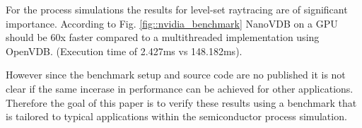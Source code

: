 For the process simulations the results for level-set raytracing are of significant importance. 
According to Fig. \ref{fig::nvidia_benchmark} NanoVDB on a GPU should be 60x faster compared to a multithreaded implementation using OpenVDB. (Execution time of 2.427ms vs 148.182ms).

However since the benchmark setup and source code are no published it is not clear if the same incerase in performance can be achieved for other applications.
Therefore the goal of this paper is to verify these results using a benchmark that is tailored to typical applications within the semiconductor process simulation.

